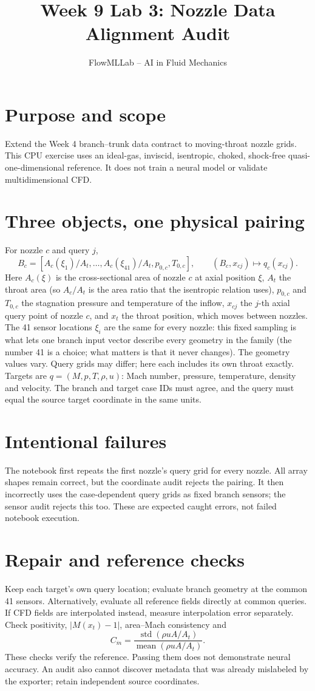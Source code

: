 \documentclass[11pt]{article}
\title{Week 9 Lab 3: Nozzle Data Alignment Audit}
\author{FlowMLLab -- AI in Fluid Mechanics}
\date{}
\begin{document}
\maketitle
\section*{Purpose and scope}
Extend the Week 4 branch--trunk data contract to moving-throat nozzle grids.
This CPU exercise uses an ideal-gas, inviscid, isentropic, choked, shock-free
quasi-one-dimensional reference. It does not train a neural model or validate
multidimensional CFD.
\section*{Three objects, one physical pairing}
For nozzle $c$ and query $j$,
\[
B_c=[A_c(\xi_1)/A_t,\ldots,A_c(\xi_{41})/A_t,p_{0,c},T_{0,c}],
\qquad (B_c,x_{cj})\mapsto q_c(x_{cj}).
\]
Here $A_c(\xi)$ is the cross-sectional area of nozzle $c$ at axial position $\xi$,
$A_t$ the throat area (so $A_c/A_t$ is the area ratio that the isentropic relation
uses), $p_{0,c}$ and $T_{0,c}$ the stagnation pressure and temperature of the
inflow, $x_{cj}$ the $j$-th axial query point of nozzle $c$, and $x_t$ the throat
position, which moves between nozzles. The 41 sensor locations $\xi_i$ are the
same for every nozzle: this fixed sampling is what lets one branch input vector
describe every geometry in the family (the number 41 is a choice; what matters
is that it never changes). The geometry values vary. Query grids
may differ; here each includes its own throat exactly. Targets are
$q=(M,p,T,\rho,u)$: Mach number, pressure, temperature, density and velocity. The branch and target case IDs must agree, and the query
must equal the source target coordinate in the same units.
\section*{Intentional failures}
The notebook first repeats the first nozzle's query grid for every nozzle.
All array shapes remain correct, but the coordinate audit rejects the pairing.
It then incorrectly uses the case-dependent query grids as fixed branch
sensors; the sensor audit rejects this too. These are expected caught errors,
not failed notebook execution.
\section*{Repair and reference checks}
Keep each target's own query location; evaluate branch geometry at the common
41 sensors. Alternatively, evaluate all reference fields directly at common
queries. If CFD fields are interpolated instead, measure interpolation error
separately. Check positivity, $|M(x_t)-1|$, area--Mach consistency and
\[
C_{\dot m}=\frac{\operatorname{std}(\rho u A/A_t)}
{\operatorname{mean}(\rho u A/A_t)}.
\]
These checks verify the reference. Passing them does not demonstrate neural
accuracy. An audit also cannot discover metadata that was already mislabeled
by the exporter; retain independent source coordinates.
\end{document}
